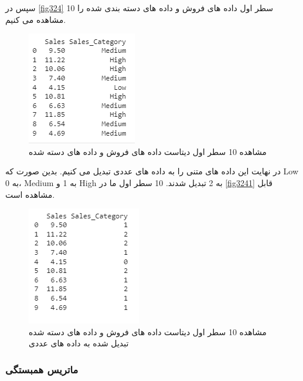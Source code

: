 \documentclass{article}
\begin{document}
سپس در \autoref{fig324} 10 سطر اول داده های فروش و داده های دسته بندی شده را مشاهده می کنیم.

\begin{figure}[h!]
    \centering
    \includegraphics[width=0.6\linewidth]{q3_p24.png}
    \caption{مشاهده 10 سطر اول دیتاست داده های فروش و داده های دسته شده }
    \label{fig324}
\end{figure}

در نهایت این داده های متنی را به داده های عددی تبدیل می کنیم. بدین صورت که Low به 0، Medium به 1 و High به 2 تبدیل شدند. 10 سطر اول ما در \autoref{fig3241} قابل مشاهده است.

\begin{figure}[h!]
    \centering
    \includegraphics[width=0.6\linewidth]{q3_p241.png}
    \caption{مشاهده 10 سطر اول دیتاست داده های فروش و داده های دسته شده تبدیل شده به داده های عددی }
    \label{fig3241}
\end{figure}


\subsubsection{ماتریس همبستگی}
\end{document}
